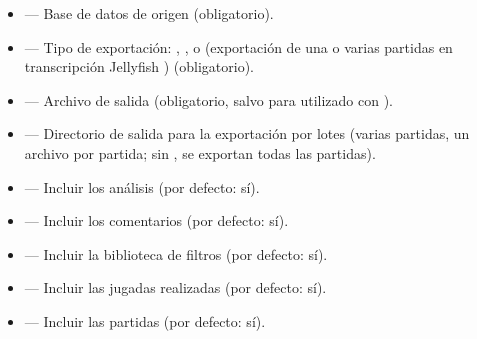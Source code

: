 \documentclass[letterpaper,10pt,spanish]{sphinxmanual}
\begin{document}
\sphinxAtStartPar
{}
\begin{itemize}
\item {} 
\sphinxAtStartPar
{} — Base de datos de origen (obligatorio).

\item {} 
\sphinxAtStartPar
{} — Tipo de exportación: , ,  o  (exportación de una o varias partidas en transcripción Jellyfish ) (obligatorio).

\item {} 
\sphinxAtStartPar
{} — Archivo de salida (obligatorio, salvo para  utilizado con ).

\item {} 
\sphinxAtStartPar
{} — Directorio de salida para la exportación  por lotes (varias partidas, un archivo por partida; sin , se exportan todas las partidas).

\item {} 
\sphinxAtStartPar
{} — Incluir los análisis (por defecto: sí).

\item {} 
\sphinxAtStartPar
{} — Incluir los comentarios (por defecto: sí).

\item {} 
\sphinxAtStartPar
{} — Incluir la biblioteca de filtros (por defecto: sí).

\item {} 
\sphinxAtStartPar
{} — Incluir las jugadas realizadas (por defecto: sí).

\item {} 
\sphinxAtStartPar
{} — Incluir las partidas (por defecto: sí).


\end{itemize}
\end{document}
